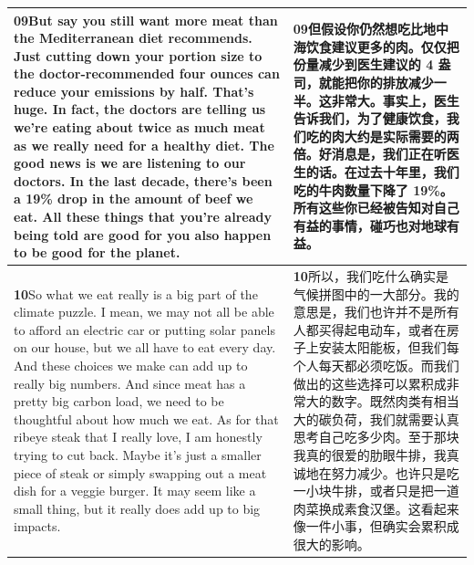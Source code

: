 \documentclass[UTF8,zihao=-4,fontset=fandol]{ctexart}
\newcommand{\TranscriptColumn}{\raggedright\arraybackslash\hyphenpenalty=10000\exhyphenpenalty=10000\sloppy}
\begin{document}
\begin{longtable}{>{\TranscriptColumn}p{} >{\TranscriptColumn}p{}}
\textbf{09}\quad But say you still want more meat than the Mediterranean diet recommends. Just cutting down your portion size to the doctor-recommended four ounces can reduce your emissions by half. That's huge. In fact, the doctors are telling us we're eating about twice as much meat as we really need for a healthy diet. The good news is we are listening to our doctors. In the last decade, there's been a 19\% drop in the amount of beef we eat. All these things that you're already being told are good for you also happen to be good for the planet. & \textbf{09}\quad 但假设你仍然想吃比地中海饮食建议更多的肉。仅仅把份量减少到医生建议的 4 盎司，就能把你的排放减少一半。这非常大。事实上，医生告诉我们，为了健康饮食，我们吃的肉大约是实际需要的两倍。好消息是，我们正在听医生的话。在过去十年里，我们吃的牛肉数量下降了 19\%。所有这些你已经被告知对自己有益的事情，碰巧也对地球有益。 \\ \hline
\textbf{10}\quad So what we eat really is a big part of the climate puzzle. I mean, we may not all be able to afford an electric car or putting solar panels on our house, but we all have to eat every day. And these choices we make can add up to really big numbers. And since meat has a pretty big carbon load, we need to be thoughtful about how much we eat. As for that ribeye steak that I really love, I am honestly trying to cut back. Maybe it's just a smaller piece of steak or simply swapping out a meat dish for a veggie burger. It may seem like a small thing, but it really does add up to big impacts. & \textbf{10}\quad 所以，我们吃什么确实是气候拼图中的一大部分。我的意思是，我们也许并不是所有人都买得起电动车，或者在房子上安装太阳能板，但我们每个人每天都必须吃饭。而我们做出的这些选择可以累积成非常大的数字。既然肉类有相当大的碳负荷，我们就需要认真思考自己吃多少肉。至于那块我真的很爱的肋眼牛排，我真诚地在努力减少。也许只是吃一小块牛排，或者只是把一道肉菜换成素食汉堡。这看起来像一件小事，但确实会累积成很大的影响。 \\ \hline
\end{longtable}
\end{document}
